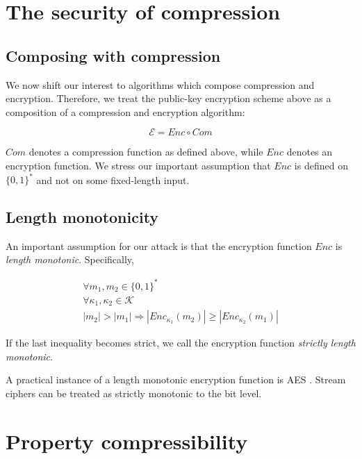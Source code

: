 \documentclass{sig-alternate-05-2015}
\begin{document}
\section{The security of compression}\label{sec:comsec}

\subsection{Composing with compression}\label{subsec:comcompose}

We now shift our interest to algorithms which compose compression and
encryption.  Therefore, we treat the public-key encryption scheme above as a
composition of a compression and encryption algorithm:

\begin{equation*}
    \mathcal{E} = Enc \circ Com
\end{equation*}

$Com$ denotes a compression function as defined above, while $Enc$ denotes an
encryption function. We stress our important assumption that $Enc$ is defined
on $\{0, 1\}^*$ and not on some fixed-length input.

\subsection{Length monotonicity}\label{subsec:lenmonotone}

An important assumption for our attack is that the encryption function $Enc$ is
\textit{length monotonic}. Specifically,

\begin{equation*}
\begin{split}
\forall m_1, m_2 \in \{0, 1\}^*\\
\forall \kappa_1, \kappa_2 \in \mathcal{K}\\
|m_2| > |m_1|
\Rightarrow
|Enc_{\kappa_1}(m_2)| \geq |Enc_{\kappa_2}(m_1)|
\end{split}
\end{equation*}

If the last inequality becomes strict, we call the encryption function
\textit{strictly length monotonic}.

A practical instance of a length monotonic encryption function is AES \cite{c8}.
Stream ciphers can be treated as strictly monotonic to the bit level.

\section{Property compressibility}\label{sec:propertycom}
\end{document}
